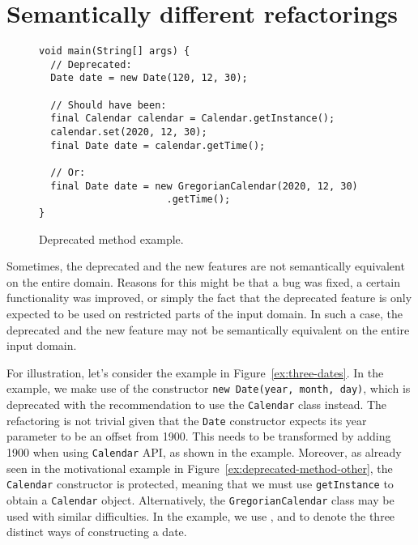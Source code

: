 \documentclass[sigconf,review,anonymous]{acmart}
\begin{document}
\section{Semantically different refactorings}\label{sec:semantically-different-refactorings}


\begin{figure}
\begin{lstlisting}[mathescape=true,showstringspaces=false]
void main(String[] args) {
  // Deprecated:
  Date date = new Date(120, 12, 30);
 
  // Should have been:
  final Calendar calendar = Calendar.getInstance();
  calendar.set(2020, 12, 30);
  final Date date = calendar.getTime();

  // Or:
  final Date date = new GregorianCalendar(2020, 12, 30)
                      .getTime();
}
\end{lstlisting}
\caption{Deprecated method example.}
\label{ex:deprecated-method}
\end{figure}


Sometimes, the deprecated and the new features are not semantically
equivalent on the entire domain. Reasons for this might be that a bug
was fixed, a certain functionality was improved, or simply the fact
that the deprecated feature is only expected to be used on restricted
parts of the input domain. In such a case, the deprecated and the new
feature may not be semantically equivalent on the entire input domain.

For illustration, let's consider the example in Figure~\ref{ex:three-dates}.
In the example, we make use of the constructor \texttt{new Date(year, month, day)}, 
which is deprecated with the 
recommendation to use the \texttt{Calendar} class instead.
The refactoring is not trivial given that the 
\texttt{Date} constructor expects its year parameter to be an offset
from 1900.  This needs to be
transformed by adding 1900 when using \texttt{Calendar} API, as shown in the
example. Moreover, as already seen in the motivational example in  Figure~\ref{ex:deprecated-method-other},
the \texttt{Calendar} constructor is protected,
meaning that we must use \texttt{getInstance} to obtain a
\texttt{Calendar} object.
Alternatively, the \texttt{GregorianCalendar} class may be used with
similar difficulties.
In the example, we use ,  and  to denote the three distinct ways of constructing a date.

\end{document}
